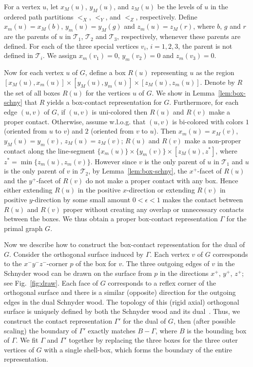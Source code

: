 \documentclass{article}
\newcommand{\TT}{{\mathcal{T}}}
\newcommand{\WLOG}{w.l.o.g.\xspace}
\begin{document}
 For a vertex $u$, let $x_M (u)$, $y_M (u)$, and $z_M (u)$ be the levels of $u$ in the ordered path
 partitions $<_X$, $ <_Y$, and $<_Z$, respectively. Define $x_m(u)=x_M(b)$, $y_m(u)=y_M(g)$ and
 $z_m(u)=z_M(r)$, where $b$, $g$ and $r$ are the parents of $u$ in $\TT_1$, $\TT_2$ and $\TT_3$,
 respectively, whenever these parents are defined. For each of the three special vertices $v_i$,
 $i=1,2,3$, the parent is not defined in $\TT_i$. We assign $x_m(v_1)=0$, $y_m(v_2)=0$ and
 $z_m(v_3)=0$.


Now for each vertex $u$ of $G$, define a box $R(u)$ representing $u$ as the region
 $[x_M(u), x_m(u)]\times[y_M(u), y_m(u)]\times[z_M(u), z_m(u)]$.
Denote by $R$ the set of all boxes $R(u)$ for the vertices $u$ of $G$. We show in
Lemma~\ref{lem:box-schny} that $R$ yields a box-contact representation for $G$.
Furthermore, for each edge $(u,v)$ of $G$, if $(u,v)$ is uni-colored then $R(u)$ and $R(v)$
make a proper contact. Otherwise, assume \WLOG that $(u,v)$ is bi-colored
with colors $1$ (oriented from $u$ to $v$) and $2$ (oriented from $v$ to $u$).
Then $x_m(u)=x_M(v)$, $y_M(u)=y_m(v)$, $z_M(u)=z_M(v)$;  $R(u)$ and $R(v)$
make a non-proper contact along the line-segment $\{x_m(u)\}\times\{y_m(v)\}\times[z_M(u), z^*]$,
where $z^*=\min\{z_m(u),z_m(v)\}$. However since $v$ is the only parent of $u$ in $\TT_1$
and $u$ is the only parent of $v$ in $\TT_2$, by Lemma~\ref{lem:box-schny},
the $x^+$-facet of $R(u)$ and the $y^+$-facet of $R(v)$ do not make a proper contact with any box.
Hence either extending $R(u)$ in the positive $x$-direction or extending $R(v)$ in positive $y$-direction
by some small amount $0<\epsilon<1$ makes the contact between $R(u)$ and $R(v)$ proper
without creating any overlap or unnecessary contacts between the boxes.
 We thus obtain a proper box-contact representation $\Gamma$ for the primal graph $G$.


Now we describe how to construct the box-contact representation for the dual of $G$.
Consider the orthogonal surface induced by $\Gamma$. Each vertex $v$ of $G$ corresponds
 to the $x^-y^-z^-$-corner $p$ of the box for $v$. The three outgoing edges of $v$ in the Schnyder
 wood can be drawn on the surface from $p$ in the directions $x^+$, $y^+$, $z^+$; see Fig.~\ref{fig:draw}.
Each face of $G$ corresponds to a reflex corner of the orthogonal surface and there is a similar
 (opposite) direction for the outgoing edges in the dual Schnyder wood. The topology of this
 (rigid axial) orthogonal
 surface is uniquely defined by both the Schnyder wood and its dual~\cite{FZ08}.
Thus, we construct the contact representation $\Gamma'$ for the dual of $G$, then (after possible scaling)
 the boundary of $\Gamma'$ exactly matches $B-\Gamma$, where $B$ is the bounding box of $\Gamma$.
We fit $\Gamma$ and $\Gamma'$ together by replacing the three boxes for the three outer vertices of $G$ with a single shell-box, which forms the boundary of the entire representation.
\end{document}
